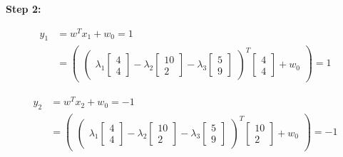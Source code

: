 \documentclass[12pt]{report}
\begin{document}
\vspace{20pt}
\textbf{Step 2:}

\begin{equation*}
	\begin{aligned}
		y_{1} & =  w^T x_{1} + w_{0} = 1            \\
		      & = \begin{pmatrix}
			          \begin{pmatrix}
				\lambda_{1}\begin{bmatrix}
					           4 \\
					           4
				           \end{bmatrix} -

				\lambda_{2}\begin{bmatrix}
					           10 \\
					           2
				           \end{bmatrix}
				-

				\lambda_{3}\begin{bmatrix}
					           5 \\
					           9
				           \end{bmatrix}
			\end{pmatrix}  ^ T
			          \begin{bmatrix}
				4 \\
				4
			\end{bmatrix} + w_{0}
		          \end{pmatrix} = 1
	\end{aligned}
\end{equation*}

\begin{equation*}
	\begin{aligned}
		y_{2} & =  w^T x_{2} + w_{0} = -1           \\
		      & = \begin{pmatrix}
			          \begin{pmatrix}
				\lambda_{1}\begin{bmatrix}
					           4 \\
					           4
				           \end{bmatrix} -

				\lambda_{2}\begin{bmatrix}
					           10 \\
					           2
				           \end{bmatrix}
				-

				\lambda_{3}\begin{bmatrix}
					           5 \\
					           9
				           \end{bmatrix}\end{pmatrix}  ^ T
			          \begin{bmatrix}
				10 \\
				2
			\end{bmatrix} + w_{0}
		          \end{pmatrix} = -1
	\end{aligned}
\end{equation*}
\end{document}
